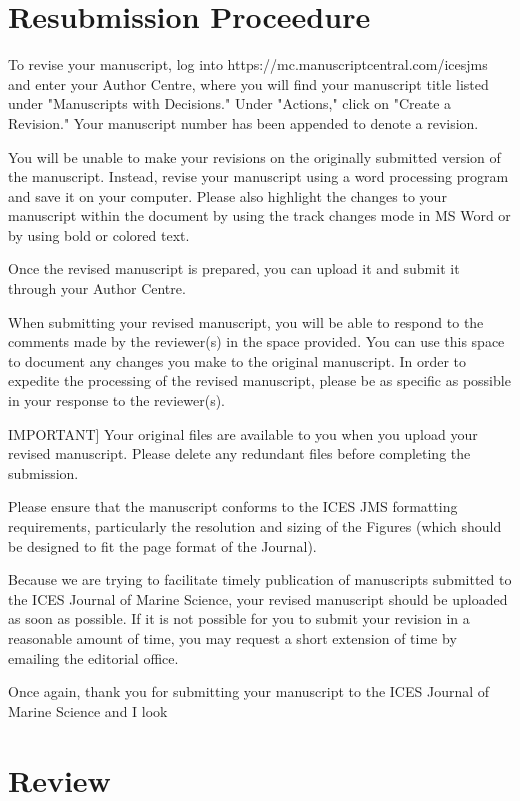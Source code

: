 
\iffalse
\section{Resubmission Proceedure}

To revise your manuscript, log into https://mc.manuscriptcentral.com/icesjms and enter your Author Centre, where you will find your manuscript title listed under "Manuscripts with Decisions."  Under "Actions," click on "Create a Revision."  Your manuscript number has been appended to denote a revision.

You will be unable to make your revisions on the originally submitted version of the manuscript.  Instead, revise your manuscript using a word processing program and save it on your computer.  Please also highlight the changes to your manuscript within the document by using the track changes mode in MS Word or by using bold or colored text.

Once the revised manuscript is prepared, you can upload it and submit it through your Author Centre.

When submitting your revised manuscript, you will be able to respond to the comments made by the reviewer(s) in the space provided.  You can use this space to document any changes you make to the original manuscript.  In order to expedite the processing of the revised manuscript, please be as specific as possible in your response to the reviewer(s).

IMPORTANT]  Your original files are available to you when you upload your revised manuscript.  Please delete any redundant files before completing the submission.

Please ensure that the manuscript conforms to the ICES JMS formatting requirements, particularly the resolution and sizing of the Figures (which should be designed to fit the page format of the Journal).

Because we are trying to facilitate timely publication of manuscripts submitted to the ICES Journal of Marine Science, your revised manuscript should be uploaded as soon as possible.  If it is not possible for you to submit your revision in a reasonable amount of time, you may request a short extension of time by emailing the  editorial office.

Once again, thank you for submitting your manuscript to the ICES Journal of Marine Science and I look 



\section*{Review}

